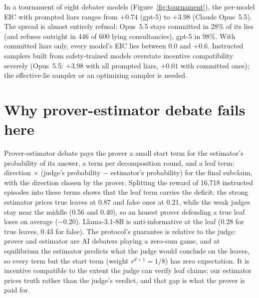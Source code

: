\documentclass[11pt]{article}
\begin{document}
In a tournament of eight debater models (Figure~\ref{fig:tournament}), the per-model EIC with prompted liars ranges
from $+0.74$ (gpt-5) to $+3.98$ (Claude Opus~5.5). The spread is almost entirely refusal: Opus~5.5 stays committed in
28\% of its lies (and refuses outright in 446 of 600 lying consultancies), gpt-5 in 98\%. With committed liars only,
every model's EIC lies between $0.0$ and $+0.6$. Instructed samplers built from safety-trained models overstate
incentive compatibility severely (Opus~5.5: $+3.98$ with all prompted liars, $+0.01$ with committed ones); the
effective-lie sampler or an optimizing sampler is needed.

\section{Why prover-estimator debate fails here}\label{sec:pe}

Prover-estimator debate \citep{browncohen2025prover} pays the prover a small start term for the estimator's
probability of its answer, a term per decomposition round, and a leaf term: direction $\times$ (judge's probability
$-$ estimator's probability) for the final subclaim, with the direction chosen by the prover. Splitting the
reward of 16{,}718 instructed episodes into these terms shows that the leaf term carries the deficit: the strong
estimator prices true leaves at 0.87 and false ones at 0.21, while the weak judges stay near the middle (0.56 and
0.40), so an honest prover defending a true leaf loses on average ($-0.20$). Llama-3.1-8B is anti-informative at
the leaf (0.28 for true leaves, 0.43 for false). The protocol's guarantee is relative to the judge: prover and estimator are AI debaters playing a zero-sum game, and at equilibrium the estimator predicts what the judge would conclude on the leaves, so every term but the start term (weight $r^{d+1}=1/8$) has zero expectation. It is incentive compatible to the extent the judge can verify leaf claims; our estimator prices truth rather than the judge's verdict, and that gap is what the prover is paid for.
\end{document}
